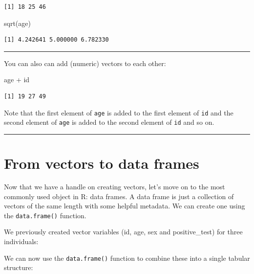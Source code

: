 \documentclass[
  letterpaper,
  DIV=11,
  numbers=noendperiod]{scrreprt}
\newenvironment{Shaded}{\begin{snugshade}}{\end{snugshade}}
\newcommand{\FunctionTok}[1]{\textcolor[rgb]{0.28,0.35,0.67}{#1}}
\newcommand{\NormalTok}[1]{\textcolor[rgb]{0.00,0.23,0.31}{#1}}
\newcommand{\SpecialCharTok}[1]{\textcolor[rgb]{0.37,0.37,0.37}{#1}}
\begin{document}
\begin{verbatim}
[1] 18 25 46
\end{verbatim}

\begin{Shaded}
\begin{Highlighting}[]
\FunctionTok{sqrt}\NormalTok{(age)}
\end{Highlighting}
\end{Shaded}

\begin{verbatim}
[1] 4.242641 5.000000 6.782330
\end{verbatim}

\begin{center}\rule{0.5\linewidth}{0.5pt}\end{center}

You can also can add (numeric) vectors to each other:

\begin{Shaded}
\begin{Highlighting}[]
\NormalTok{age }\SpecialCharTok{+}\NormalTok{ id}
\end{Highlighting}
\end{Shaded}

\begin{verbatim}
[1] 19 27 49
\end{verbatim}

Note that the first element of \texttt{age} is added to the first
element of \texttt{id} and the second element of \texttt{age} is added
to the second element of \texttt{id} and so on.

\begin{center}\rule{0.5\linewidth}{0.5pt}\end{center}

\hypertarget{from-vectors-to-data-frames}{%
\section{From vectors to data
frames}\label{from-vectors-to-data-frames}}

Now that we have a handle on creating vectors, let's move on to the most
commonly used object in R: data frames. A data frame is just a
collection of vectors of the same length with some helpful metadata. We
can create one using the \texttt{data.frame()} function.

We previously created vector variables (id, age, sex and positive\_test)
for three individuals:

We can now use the \texttt{data.frame()} function to combine these into
a single tabular structure:
\end{document}
